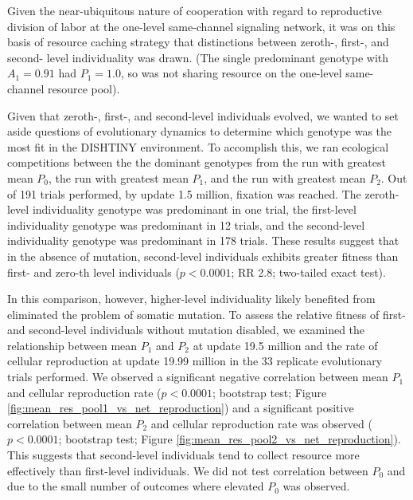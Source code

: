 Given the near-ubiquitous nature of cooperation with regard to reproductive division of labor at the one-level same-channel signaling network, it was on this basis of resource caching strategy that distinctions between zeroth-, first-, and second- level individuality was drawn.
(The single predominant genotype with $A_1 = 0.91$ had $P_1 = 1.0$, so was not sharing resource on the one-level same-channel resource pool).

Given that zeroth-, first-, and second-level individuals evolved, we wanted to set aside questions of evolutionary dynamics to determine which genotype was the most fit in the DISHTINY environment.
To accomplish this, we ran ecological competitions between the the dominant genotypes from the run with greatest mean $P_0$, the run with greatest mean $P_1$, and the run with greatest mean $P_2$.
Out of 191 trials performed, by update 1.5 million, fixation was reached.
The zeroth-level individuality genotype was predominant in one trial, the first-level individuality genotype was predominant in 12 trials, and the second-level individuality genotype was predominant in 178 trials.
These results suggest that in the absence of mutation, second-level individuals exhibits greater fitness than first- and zero-th level individuals ($p < 0.0001$; RR 2.8; two-tailed exact test).

In this comparison, however, higher-level individuality likely benefited from eliminated the problem of somatic mutation.
To assess the relative fitness of first- and second-level individuals without mutation disabled, we examined the relationship between mean $P_1$ and $P_2$ at update 19.5 million and the rate of cellular reproduction at update 19.99 million in the 33 replicate evolutionary trials performed.
We observed a significant negative correlation between mean $P_1$ and cellular reproduction rate ($p < 0.0001$; bootstrap test; Figure \ref{fig:mean_res_pool1_vs_net_reproduction}) and a significant positive correlation between mean $P_2$ and cellular reproduction rate was observed ($p < 0.0001$; bootstrap test; Figure \ref{fig:mean_res_pool2_vs_net_reproduction}).
This suggests that second-level individuals tend to collect resource more effectively than first-level individuals.
We did not test correlation between $P_0$ and due to the small number of outcomes where elevated $P_0$ was observed.

